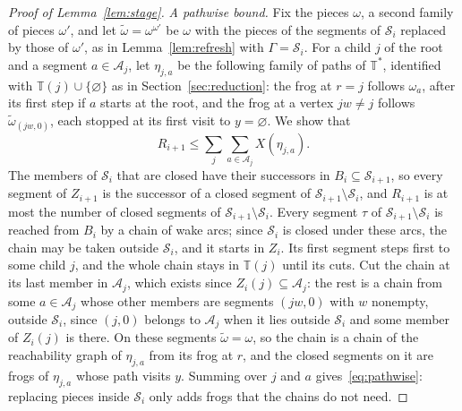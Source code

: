 \documentclass[11pt]{amsart}
\theoremstyle{definition}
\numberwithin{equation}{section}
\newcommand{\T}{\mathbb{T}}
\newcommand{\Ts}{\mathbb{T}^{*}}
\newcommand{\cS}{\mathcal{S}}
\newcommand{\cA}{\mathcal{A}}
\begin{document}
\begin{proof}[Proof of Lemma~\ref{lem:stage}]
\emph{A pathwise bound.} Fix the pieces $\omega$, a second family of pieces $\omega'$, and let $\tilde\omega=\omega^{\omega'}$ be $\omega$ with the pieces of the segments of $\cS_i$ replaced by those of $\omega'$, as in Lemma~\ref{lem:refresh} with $\Gamma=\cS_i$. For a child $j$ of the root and a segment $a\in\cA_j$, let $\eta_{j,a}$ be the following family of paths of $\Ts$, identified with $\T(j)\cup\{\varnothing\}$ as in Section~\ref{sec:reduction}: the frog at $r=j$ follows $\omega_a$, after its first step if $a$ starts at the root, and the frog at a vertex $jw\ne j$ follows $\tilde\omega_{(jw,0)}$, each stopped at its first visit to $y=\varnothing$. We show that
\begin{equation}\label{eq:pathwise}
R_{i+1}\le\sum_j\sum_{a\in\cA_j}X(\eta_{j,a}).
\end{equation}
The members of $\cS_i$ that are closed have their successors in $B_i\subseteq\cS_{i+1}$, so every segment of $Z_{i+1}$ is the successor of a closed segment of $\cS_{i+1}\setminus\cS_i$, and $R_{i+1}$ is at most the number of closed segments of $\cS_{i+1}\setminus\cS_i$. Every segment $\tau$ of $\cS_{i+1}\setminus\cS_i$ is reached from $B_i$ by a chain of wake arcs; since $\cS_i$ is closed under these arcs, the chain may be taken outside $\cS_i$, and it starts in $Z_i$. Its first segment steps first to some child $j$, and the whole chain stays in $\T(j)$ until its cuts. Cut the chain at its last member in $\cA_j$, which exists since $Z_i(j)\subseteq\cA_j$: the rest is a chain from some $a\in\cA_j$ whose other members are segments $(jw,0)$ with $w$ nonempty, outside $\cS_i$, since $(j,0)$ belongs to $\cA_j$ when it lies outside $\cS_i$ and some member of $Z_i(j)$ is there. On these segments $\tilde\omega=\omega$, so the chain is a chain of the reachability graph of $\eta_{j,a}$ from its frog at $r$, and the closed segments on it are frogs of $\eta_{j,a}$ whose path visits $y$. Summing over $j$ and $a$ gives~\eqref{eq:pathwise}: replacing pieces inside $\cS_i$ only adds frogs that the chains do not need.


\end{proof}
\end{document}
